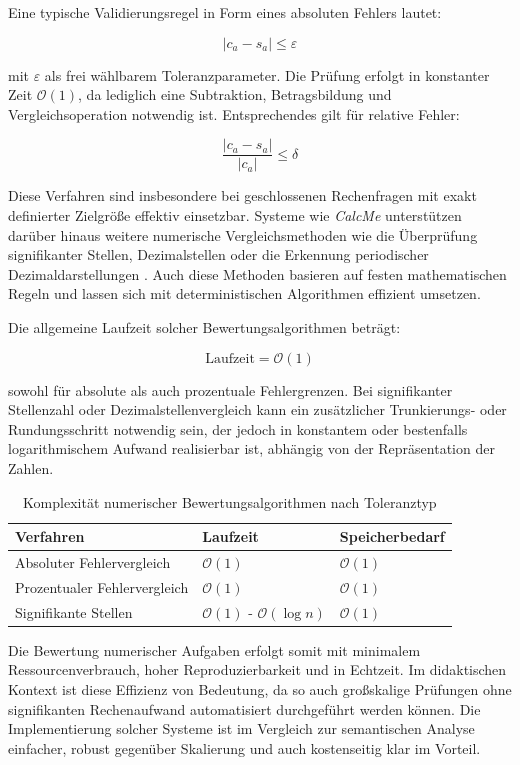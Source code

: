 \documentclass[a4paper,12pt]{article}
\begin{document}
Eine typische Validierungsregel in Form eines absoluten Fehlers lautet:

\[
|c_a - s_a| \leq \varepsilon
\]

mit \(\varepsilon\) als frei wählbarem Toleranzparameter. Die Prüfung erfolgt in konstanter Zeit \( \mathcal{O}(1) \), da lediglich eine Subtraktion, Betragsbildung und Vergleichsoperation notwendig ist. Entsprechendes gilt für relative Fehler:

\[
\frac{|c_a - s_a|}{|c_a|} \leq \delta
\]

Diese Verfahren sind insbesondere bei geschlossenen Rechenfragen mit exakt definierter Zielgröße effektiv einsetzbar. Systeme wie \textit{CalcMe} unterstützen darüber hinaus weitere numerische Vergleichsmethoden wie die Überprüfung signifikanter Stellen, Dezimalstellen oder die Erkennung periodischer Dezimaldarstellungen \parencite{calcme}. Auch diese Methoden basieren auf festen mathematischen Regeln und lassen sich mit deterministischen Algorithmen effizient umsetzen.

Die allgemeine Laufzeit solcher Bewertungsalgorithmen beträgt:

\[
\text{Laufzeit} = \mathcal{O}(1)
\]

sowohl für absolute als auch prozentuale Fehlergrenzen. Bei signifikanter Stellenzahl oder Dezimalstellenvergleich kann ein zusätzlicher Trunkierungs- oder Rundungsschritt notwendig sein, der jedoch in konstantem oder bestenfalls logarithmischem Aufwand realisierbar ist, abhängig von der Repräsentation der Zahlen.

\begin{table}[h!]
\centering
\begin{tabular}{@{}lll@{}}
\toprule
\textbf{Verfahren} & \textbf{Laufzeit} & \textbf{Speicherbedarf} \\
\midrule
Absoluter Fehlervergleich & \( \mathcal{O}(1) \) & \( \mathcal{O}(1) \) \\
Prozentualer Fehlervergleich & \( \mathcal{O}(1) \) & \( \mathcal{O}(1) \) \\
Signifikante Stellen & \( \mathcal{O}(1) \) - \( \mathcal{O}(\log n) \) & \( \mathcal{O}(1) \) \\
\bottomrule
\end{tabular}
\caption{Komplexität numerischer Bewertungsalgorithmen nach Toleranztyp}
\end{table}

Die Bewertung numerischer Aufgaben erfolgt somit mit minimalem Ressourcenverbrauch, hoher Reproduzierbarkeit und in Echtzeit. Im didaktischen Kontext ist diese Effizienz von Bedeutung, da so auch großskalige Prüfungen ohne signifikanten Rechenaufwand automatisiert durchgeführt werden können. Die Implementierung solcher Systeme ist im Vergleich zur semantischen Analyse einfacher, robust gegenüber Skalierung und auch kostenseitig klar im Vorteil.
\end{document}
